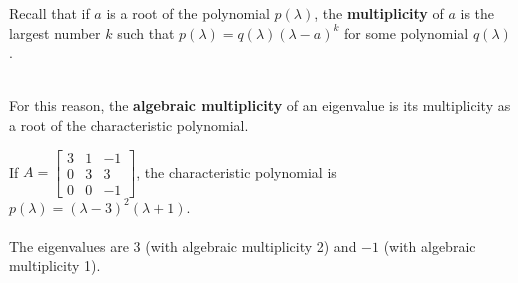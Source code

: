 \begin{applicationActivities}
\begin{observation}
  Recall that if \(a\) is a root of the polynomial \(p(\lambda)\), the {\bf multiplicity} of $a$ is the largest number $k$ such that \(p(\lambda)=q(\lambda)(\lambda-a)^k\) for some polynomial $q(\lambda)$.

\ \\

  For this reason, the {\bf algebraic multiplicity} of an eigenvalue is its multiplicity as a root of the characteristic polynomial.

  \end{observation}
  \begin{example}
  If $A=\begin{bmatrix} 3 & 1 & -1 \\ 0 & 3 & 3 \\ 0 & 0 & -1 \end{bmatrix}$, the characteristic polynomial is $p(\lambda) = (\lambda-3)^2 (\lambda+1)$. \\
  \ \\
  The eigenvalues are $3$ (with algebraic multiplicity 2) and $-1$ (with algebraic multiplicity 1).
  \end{example}

\end{applicationActivities}
